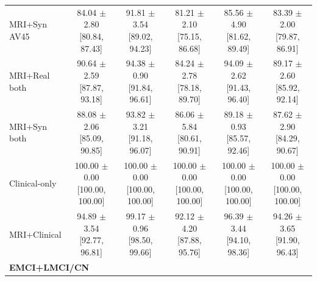 \begin{landscape}
\begin{longtable}{lccccc}
MRI+Syn AV45 & \shortstack{84.04 $\pm$ 2.80\\{}[80.84, 87.43]} & \shortstack{91.81 $\pm$ 3.54\\{}[89.02, 94.23]} & \shortstack{81.21 $\pm$ 2.10\\{}[75.15, 86.68]} & \shortstack{85.56 $\pm$ 4.90\\{}[81.62, 89.49]} & \shortstack{83.39 $\pm$ 2.00\\{}[79.87, 86.91]} \\
MRI+Real both & \shortstack{90.64 $\pm$ 2.59\\{}[87.87, 93.18]} & \shortstack{94.38 $\pm$ 0.90\\{}[91.84, 96.61]} & \shortstack{84.24 $\pm$ 2.78\\{}[78.18, 89.70]} & \shortstack{94.09 $\pm$ 2.62\\{}[91.43, 96.40]} & \shortstack{89.17 $\pm$ 2.60\\{}[85.92, 92.14]} \\
MRI+Syn both & \shortstack{88.08 $\pm$ 2.06\\{}[85.09, 90.85]} & \shortstack{93.82 $\pm$ 3.21\\{}[91.18, 96.07]} & \shortstack{86.06 $\pm$ 5.84\\{}[80.61, 90.91]} & \shortstack{89.18 $\pm$ 0.93\\{}[85.57, 92.46]} & \shortstack{87.62 $\pm$ 2.90\\{}[84.29, 90.67]} \\
Clinical-only & \shortstack{100.00 $\pm$ 0.00\\{}[100.00, 100.00]} & \shortstack{100.00 $\pm$ 0.00\\{}[100.00, 100.00]} & \shortstack{100.00 $\pm$ 0.00\\{}[100.00, 100.00]} & \shortstack{100.00 $\pm$ 0.00\\{}[100.00, 100.00]} & \shortstack{100.00 $\pm$ 0.00\\{}[100.00, 100.00]} \\
MRI+Clinical & \shortstack{94.89 $\pm$ 3.54\\{}[92.77, 96.81]} & \shortstack{99.17 $\pm$ 0.96\\{}[98.50, 99.66]} & \shortstack{92.12 $\pm$ 4.20\\{}[87.88, 95.76]} & \shortstack{96.39 $\pm$ 3.44\\{}[94.10, 98.36]} & \shortstack{94.26 $\pm$ 3.65\\{}[91.90, 96.43]} \\
\midrule
\multicolumn{6}{l}{\textbf{EMCI+LMCI/CN}} \\

\end{longtable}
\end{landscape}
